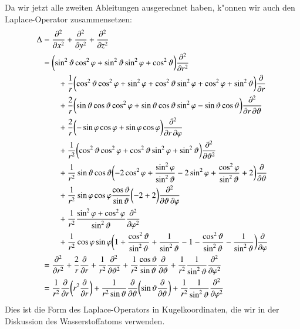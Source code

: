 Da wir jetzt alle zweiten Ableitungen ausgerechnet haben, k"onnen wir auch
den Laplace-Operator zusammensetzen:
\begin{align}
\Delta
&=
\frac{\partial^2}{\partial x^2}+
\frac{\partial^2}{\partial y^2}+
\frac{\partial^2}{\partial z^2}
\notag
\\
&=
\biggl(
\sin^2\vartheta\cos^2\varphi
+
\sin^2\vartheta\sin^2\varphi
+
\cos^2\vartheta
\biggr)
\frac{\partial^2}{\partial r^2}
\notag
\\
&\qquad
+
\frac1r\biggl(
\cos^2\vartheta\cos^2\varphi+\sin^2\varphi
+
\cos^2\vartheta\sin^2\varphi +\cos^2\varphi
+
\sin^2\vartheta
\biggr)
\frac{\partial}{\partial r}
\notag
\\
&\qquad
+
\frac2r\biggl(
\sin\vartheta\cos\vartheta\cos^2\varphi
+
\sin\vartheta\cos\vartheta\sin^2\varphi
-\sin\vartheta\cos\vartheta
\biggr)
\frac{\partial^2}{\partial r\,\partial\vartheta}
\notag
\\
&\qquad
+
\frac{2}{r}
\biggl(
-\sin\varphi\cos\varphi
+ \sin\varphi\cos\varphi
\biggr)
\frac{\partial^2}{\partial r\,\partial\varphi}
\notag
\\
&\qquad
+
\frac1{r^2}
\biggl(
\cos^2\vartheta\cos^2\varphi
+\cos^2\vartheta\sin^2\varphi
+\sin^2\vartheta
\biggr)
\frac{\partial^2}{\partial\vartheta^2}
\notag
\\
&\qquad
+
\frac1{r^2}
\sin\vartheta\cos\vartheta
\biggl(
-2 \cos^2\varphi
	+\frac{\sin^2\varphi}{\sin^2\vartheta}
-2\sin^2\varphi
+\frac{\cos^2\varphi}{\sin^2\vartheta}
+
2
\biggr)
\frac{\partial}{\partial\vartheta}
\notag
\\
&\qquad
+
\frac1{r^2}\sin\varphi\cos\varphi\frac{\cos\vartheta}{\sin\vartheta}
\biggl(
-2+2
\biggr)
\frac{\partial^2}{\partial\vartheta\,\partial\varphi}
\notag
\\
&\qquad
+
\frac1{r^2}\frac{\sin^2\varphi+\cos^2\varphi}{\sin^2\vartheta}
\frac{\partial^2}{\partial\varphi^2}
\notag
\\
&\qquad
+
\frac1{r^2}\cos\varphi\sin\varphi
\biggl(
1+\frac{\cos^2\vartheta}{\sin^2\vartheta}+\frac1{\sin^2\vartheta}
-1-\frac{\cos^2\vartheta}{\sin^2\vartheta}-\frac1{\sin^2\vartheta}
\biggr)
\frac{\partial}{\partial\varphi}
\notag
\\
&=
\frac{\partial^2}{\partial r^2}
+\frac{2}{r}\frac{\partial}{\partial r}
+\frac1{r^2}
\frac{\partial^2}{\partial\vartheta^2}
+
\frac1{r^2}
\frac{\cos\vartheta}{\sin\vartheta}
\frac{\partial}{\partial\vartheta}
+
\frac1{r^2}\frac1{\sin^2\vartheta}\frac{\partial^2}{\partial\varphi^2}
\notag
\\
&=
\frac1{r^2}\frac{\partial}{\partial r}\biggl(
r^2\frac{\partial}{\partial r}
\biggr)
+\frac1{r^2\sin\vartheta}\frac{\partial}{\partial\vartheta}\biggl(
\sin\vartheta\frac{\partial}{\partial\vartheta}
\biggr)
+\frac1{r^2}\frac1{\sin^2\vartheta}\frac{\partial^2}{\partial\varphi^2}
\label{skript:laplacekugel}
\end{align}
Dies ist die Form des Laplace-Operators in Kugelkoordinaten, die
wir in der Diskussion des Wasserstoffatoms verwenden.
